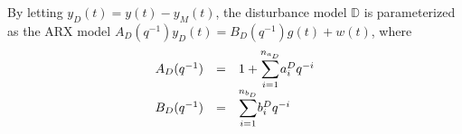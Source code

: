 \documentclass[letterpaper, 10 pt, conference]{ieeeconf}  %
\begin{document}
By letting $y_D(t) = y(t) - y_M(t)$, the disturbance model $\mathbb{D}$ is parameterized as the ARX model $A_D(q^{-1})y_D(t) = B_D(q^{-1})g(t)+w(t)$, where 
	\begin{equation*}
	\begin{array}{rcl}
	A_D(q^{-1}) &=& 1+\mathlarger{\sum\limits_{i=1}^{n_{a_D}}}a_i^Dq^{-i}\\
	B_D(q^{-1}) &=& \mathlarger{\sum\limits_{i=1}^{n_{b_D}}}b_i^Dq^{-i}
	\end{array}  
	\end{equation*}
\end{document}
